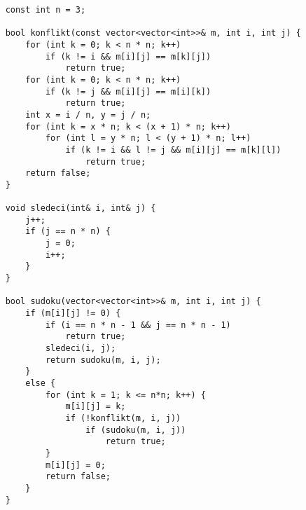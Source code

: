 \documentclass{article}
\begin{document}
\begin{lstlisting}
    const int n = 3;

    bool konflikt(const vector<vector<int>>& m, int i, int j) {
        for (int k = 0; k < n * n; k++)
            if (k != i && m[i][j] == m[k][j])
                return true;
        for (int k = 0; k < n * n; k++)
            if (k != j && m[i][j] == m[i][k])
                return true;
        int x = i / n, y = j / n;
        for (int k = x * n; k < (x + 1) * n; k++)
            for (int l = y * n; l < (y + 1) * n; l++)
                if (k != i && l != j && m[i][j] == m[k][l])
                    return true;
        return false;
    }
    
    void sledeci(int& i, int& j) {
        j++;
        if (j == n * n) {
            j = 0;
            i++;
        }
    }
    
    bool sudoku(vector<vector<int>>& m, int i, int j) {
        if (m[i][j] != 0) {
            if (i == n * n - 1 && j == n * n - 1)
                return true;
            sledeci(i, j);
            return sudoku(m, i, j);
        } 
        else {
            for (int k = 1; k <= n*n; k++) {
                m[i][j] = k;
                if (!konflikt(m, i, j))
                    if (sudoku(m, i, j))
                        return true;
            }
            m[i][j] = 0;
            return false;
        }
    }
\end{lstlisting}
\newpage
\end{document}
